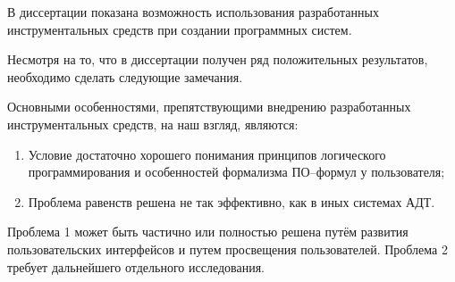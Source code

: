
В диссертации показана возможность использования разработанных инструментальных средств при создании программных систем.

Несмотря на то, что в диссертации получен ряд положительных результатов, необходимо сделать следующие замечания.

Основными особенностями, препятствующими внедрению разработанных инструментальных средств, на наш взгляд, являются:

\begin{enumerate}
\item Условие достаточно хорошего понимания принципов логического программирования и особенностей формализма ПО--формул у пользователя;
\item Проблема равенств решена не так эффективно, как в иных системах АДТ. %
\end{enumerate}

Проблема 1 может быть частично или полностью решена путём развития пользовательских интерфейсов и путем просвещения пользователей. Проблема 2 требует дальнейшего отдельного исследования.

